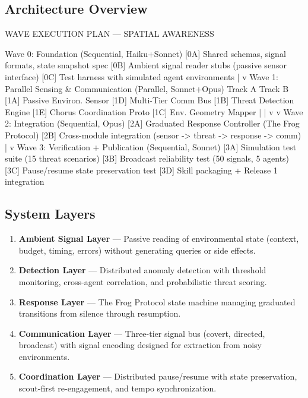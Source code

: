 \documentclass[11pt,letterpaper]{article}
\begin{document}
\subsection{Architecture Overview}

\begin{asciibox}
WAVE EXECUTION PLAN — SPATIAL AWARENESS

Wave 0: Foundation (Sequential, Haiku+Sonnet)
  [0A] Shared schemas, signal formats, state snapshot spec
  [0B] Ambient signal reader stubs (passive sensor interface)
  [0C] Test harness with simulated agent environments
        |
        v
Wave 1: Parallel Sensing & Communication (Parallel, Sonnet+Opus)
  Track A                       Track B
  [1A] Passive Environ. Sensor  [1D] Multi-Tier Comm Bus
  [1B] Threat Detection Engine  [1E] Chorus Coordination Proto
  [1C] Env. Geometry Mapper
        |                             |
        v                             v
Wave 2: Integration (Sequential, Opus)
  [2A] Graduated Response Controller (The Frog Protocol)
  [2B] Cross-module integration (sensor -> threat -> response -> comm)
        |
        v
Wave 3: Verification + Publication (Sequential, Sonnet)
  [3A] Simulation test suite (15 threat scenarios)
  [3B] Broadcast reliability test (50 signals, 5 agents)
  [3C] Pause/resume state preservation test
  [3D] Skill packaging + Release 1 integration
\end{asciibox}

\subsection{System Layers}

\begin{enumerate}[leftmargin=2em]
\item \textbf{Ambient Signal Layer} --- Passive reading of environmental state (context, budget, timing, errors) without generating queries or side effects.
\item \textbf{Detection Layer} --- Distributed anomaly detection with threshold monitoring, cross-agent correlation, and probabilistic threat scoring.
\item \textbf{Response Layer} --- The Frog Protocol state machine managing graduated transitions from silence through resumption.
\item \textbf{Communication Layer} --- Three-tier signal bus (covert, directed, broadcast) with signal encoding designed for extraction from noisy environments.
\item \textbf{Coordination Layer} --- Distributed pause/resume with state preservation, scout-first re-engagement, and tempo synchronization.
\end{enumerate}
\end{document}
